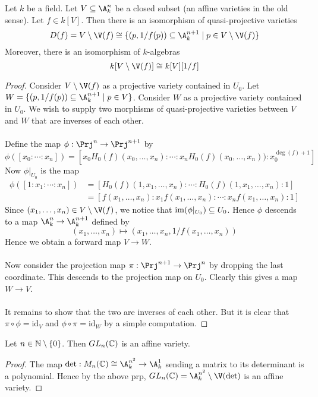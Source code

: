\documentclass[a4paper]{article}
\begin{document}
\begin{prp}{}{} Let $k$ be a field. Let $V\subseteq\A_k^n$ be a closed subset (an affine varieties in the old sense). Let $f\in k[V]$. Then there is an isomorphism of quasi-projective varieties $$D(f)=V\setminus\V(f)\cong\{(p,1/f(p))\subseteq\A_k^{n+1}\;|\;p\in V\setminus\V(f)\}$$ Moreover, there is an isomorphism of $k$-algebras $$k[V\setminus\V(f)]\cong k[V][1/f]$$ 
\begin{proof}
Consider $V\setminus\V(f)$ as a projective variety contained in $U_0$. Let $W=\{(p,1/f(p))\subseteq\A_k^{n+1}\;|\;p\in V\}$. Consider $W$ as a projective variety contained in $U_0$. We wish to supply two morphisms of quasi-projective varieties between $V$ and $W$ that are inverses of each other. \\~\\

Define the map $\phi:\Prj^n\to\Prj^{n+1}$ by $$\phi([x_0:\cdots:x_n])=\left[x_0H_0(f)(x_0,\dots,x_n):\cdots:x_nH_0(f)(x_0,\dots,x_n)):x_0^{\deg(f)+1}\right]$$ Now $\phi|_{U_0}$ is the map 
\begin{align*}
\phi([1:x_1:\cdots:x_n])&=\left[H_0(f)(1,x_1,\dots,x_n):\cdots:H_0(f)(1,x_1,\dots,x_n):1\right]\\
&=[f(x_1,\dots,x_n):x_1f(x_1,\dots,x_n):\cdots:x_nf(x_1,\dots,x_n):1]
\end{align*}
Since $(x_1,\dots,x_n)\in V\setminus\V(f)$, we notice that $\operatorname{im}(\phi|_{U_0})\subseteq U_0$. Hence $\phi$ descends to a map $\A_k^n\to\A_k^{n+1}$ defined by $$(x_1,\dots,x_n)\mapsto(x_1,\dots,x_n,1/f(x_1,\dots,x_n))$$ Hence we obtain a forward map $V\to W$. \\~\\

Now consider the projection map $\pi:\Prj^{n+1}\to\Prj^n$ by dropping the last coordinate. This descends to the projection map on $U_0$. Clearly this gives a map $W\to V$. \\~\\

It remains to show that the two are inverses of each other. But it is clear that $\pi\circ\phi=\text{id}_V$ and $\phi\circ\pi=\text{id}_W$ by a simple computation. 
\end{proof}
\end{prp}

\begin{eg}{}{} Let $n\in\mathbb{N}\setminus\{0\}$. Then $GL_n(\mathbb{C})$ is an affine variety. 
\begin{proof}
The map $\det:M_n(\C)\cong\A_k^{n^2}\to\A_k^1$ sending a matrix to its determinant is a polynomial. Hence by the above prp, $GL_n(\C)=\A_k^{n^2}\setminus\V(\det)$ is an affine variety. 
\end{proof}
\end{eg}
\end{document}

